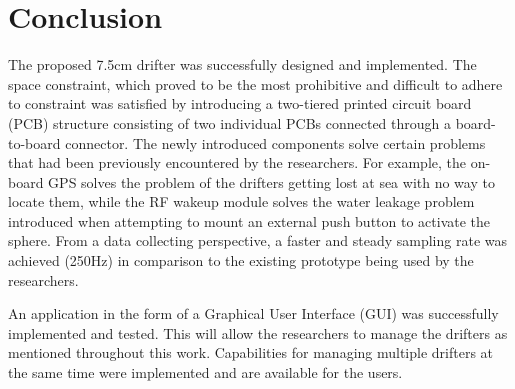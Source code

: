 \section{Conclusion}

The proposed 7.5cm drifter was successfully designed and implemented.  The space constraint, which proved to be the most prohibitive and difficult to adhere to constraint was satisfied by introducing a two-tiered printed circuit board (PCB) structure consisting of two individual PCBs connected through a board-to-board connector.  The newly introduced components solve certain problems that had been previously encountered by the researchers.  For example, the on-board GPS solves the problem of the drifters getting lost at sea with no way to locate them, while the RF wakeup module solves the water leakage problem introduced when attempting to mount an external push button to activate the sphere.  From a data collecting perspective, a faster and steady sampling rate was achieved (250Hz) in comparison to the existing prototype being used by the researchers.  

An application in the form of a Graphical User Interface (GUI) was successfully implemented and tested.  This will allow the researchers to manage the drifters as mentioned throughout this work.  Capabilities for managing multiple drifters at the same time were implemented and are available for the users.